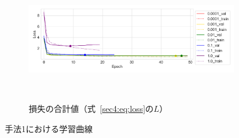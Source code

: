 \documentclass[12pt]{jarticle}
\numberwithin{equation}{section}    %
\numberwithin{figure}{section}      %
\numberwithin{table}{section}      %
\begin{document}
\begin{figure}[bt]
    \begin{subfigure}{\linewidth}
        \centering
        \includegraphics[height=55mm]{./figure/sec4/learning_curve/impact_of_loss_weights_across_methods/0/total_loss.png}
        \caption{損失の合計値（式~\eqref{sec4:eq:loss}の$L$）}
        \label{sec4:fig:learning_curve_method_1_val_total_loss}
    \end{subfigure}
    \caption{手法1における学習曲線}
    \label{sec4:fig:learning_curve_method_1_val_losses}
\end{figure}
\end{document}
